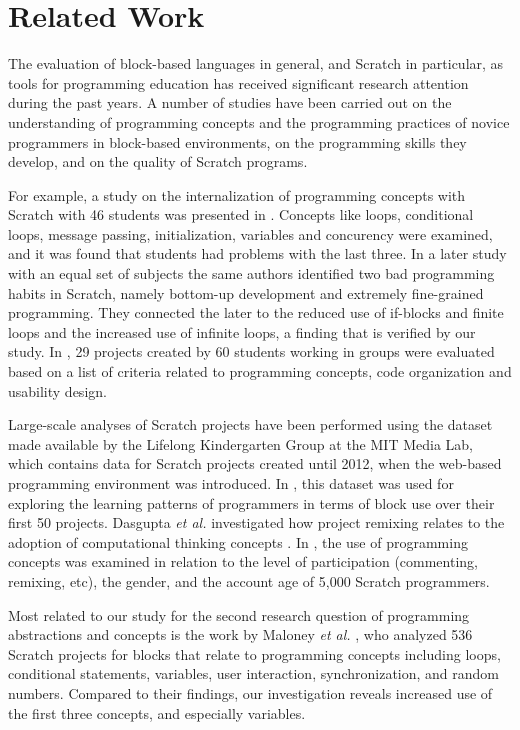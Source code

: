 \documentclass{sig-alternate-05-2015}
\begin{document}
\section{Related Work}
\label{sec:related}

The evaluation of block-based languages in general, and Scratch in particular, as tools for programming education has received significant research attention during the past years. A number of studies have been carried out on the understanding of programming concepts and the programming practices of novice programmers in block-based environments, on the programming skills they develop, and on the quality of Scratch programs.

For example, a study on the internalization of programming concepts with Scratch with 46 students was presented in \cite{meerbaum-salant_learning_2010}. Concepts like loops, conditional loops, message passing, initialization, variables and concurency were examined, and it was found that students had problems with the last three. In a later study with an equal set of subjects \cite{Meerbaum_habits_2011} the same authors identified two bad programming habits in Scratch, namely bottom-up development and extremely fine-grained programming. They connected the later to the reduced use of if-blocks and finite loops and the increased use of infinite loops, a finding that is verified by our study. In \cite{wilson_evaluation_2012}, 29 projects created by 60 students working in groups were evaluated based on a list of criteria related to programming concepts, code organization and usability design.

Large-scale analyses of Scratch projects have been performed using the dataset made available by the Lifelong Kindergarten Group at the MIT Media Lab, which contains data for Scratch projects created until 2012, when the web-based programming environment was introduced. In \cite{yang_2015}, this dataset was used for exploring the learning patterns of programmers in terms of block use over their first 50 projects. Dasgupta \emph{et al.} investigated how project remixing relates to the adoption of computational thinking concepts \cite{Dasgupta_2016}. In \cite{fields_2014}, the use of programming concepts was examined in relation to the level of participation (commenting, remixing, etc), the gender, and the account age of 5,000 Scratch programmers.

Most related to our study for the second research question of programming abstractions and concepts is the work by Maloney \emph{et al.} \cite{Maloney_2008}, who analyzed 536 Scratch projects for blocks that relate to programming concepts including loops, conditional statements, variables, user interaction, synchronization, and random numbers. Compared to their findings, our investigation reveals increased use of the first three concepts, and especially variables.
\end{document}
